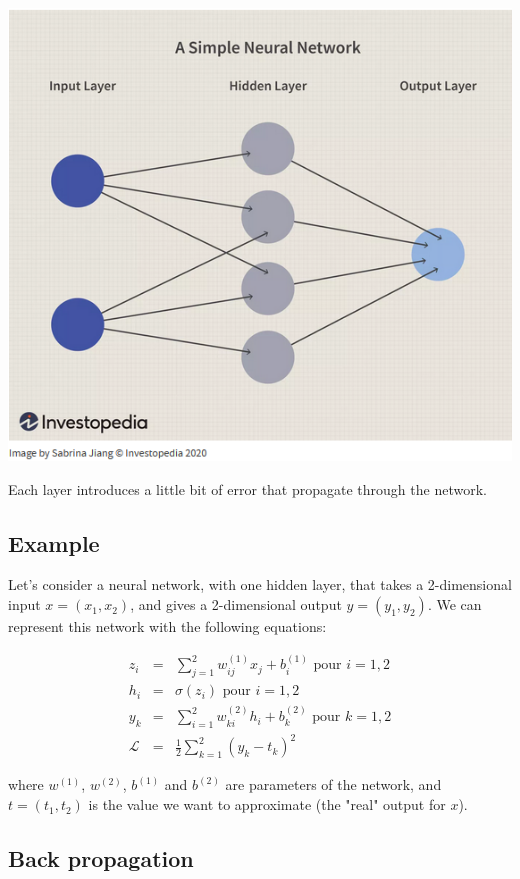 \documentclass[10pt,a4paper]{article}
\theoremstyle{definition}
\theoremstyle{theorem}
\begin{document}
\includegraphics[scale=0.7]{nn.png}

Each layer introduces a little bit of error that propagate through the network. 

\subsection{Example}

Let's consider a neural network, with one hidden layer, that takes a 2-dimensional input $x = (x_1, x_2)$, and gives a 2-dimensional output $y = (y_1,y_2)$. We can represent this network with the following equations:

   \begin{eqnarray}
   \nonumber
   z_i & = & \sum_{j=1}^2 w_{ij}^{(1)}x_j + b_i^{(1)} \text{ pour } i = 1,2 \\ 
   \nonumber
   h_i & = & \sigma (z_i) \text{ pour } i=1,2 \\
   \nonumber
   y_k & = & \sum_{i=1}^2 w_{ki}^{(2)}h_i + b_k^{(2)} \text{ pour } k = 1,2 \\
   \nonumber
   \mathcal{L} & = & \frac{1}{2} \sum_{k = 1}^2 (y_k - t_k)^2
   \end{eqnarray}
   
where $w^{(1)}$, $w^{(2)}$, $b^{(1)}$ and $b^{(2)}$ are parameters of the network, and $t = (t_1, t_2)$ is the value we want to approximate (the "real" output for $x$). 

\subsection{Back propagation}
\end{document}
